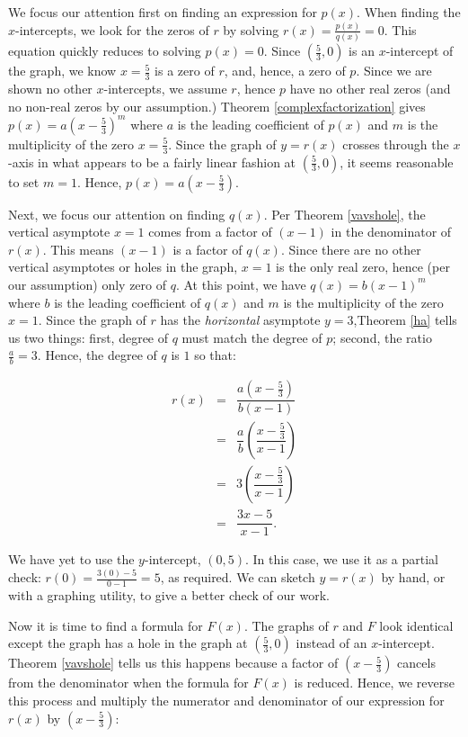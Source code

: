 \documentclass{ximera}
\begin{document}
\begin{example}
We focus our attention first on finding an expression for $p(x)$.  When finding the $x$-intercepts, we look for the zeros of $r$ by solving $r(x) = \frac{p(x)}{q(x)} = 0$.  This equation quickly reduces to solving $p(x) =0$.  Since  $\left(\frac{5}{3}, 0 \right)$ is an $x$-intercept of the graph, we know $x = \frac{5}{3}$ is a zero of $r$, and, hence, a zero of $p$.  Since we are shown no other $x$-intercepts, we assume $r$, hence $p$ have no other real zeros (and no non-real zeros by our assumption.)  Theorem \ref{complexfactorization}  gives  $p(x) = a\left(x - \frac{5}{3}\right)^m$ where $a$ is the leading coefficient of $p(x)$ and $m$ is the multiplicity of the zero $x = \frac{5}{3}$.  Since the graph of $y = r(x)$ crosses through the $x$-axis in what appears to be a fairly linear fashion at  $\left(\frac{5}{3}, 0 \right)$, it seems reasonable to set $m=1$.  Hence, $p(x) = a \left(x - \frac{5}{3}\right)$.

Next, we focus our attention on finding $q(x)$.  Per Theorem \ref{vavshole}, the vertical asymptote  $x=1$ comes from a factor of $(x-1)$ in the denominator of $r(x)$.  This means $(x-1)$ is a factor of $q(x)$.  Since there are no other vertical asymptotes or holes in the graph, $x=1$ is the only real zero, hence (per our assumption) only zero of $q$.  At this point, we have $q(x) = b(x-1)^m$ where $b$ is the leading coefficient of $q(x)$ and $m$ is the multiplicity of the zero $x=1$.  Since the graph of  $r$ has the \textit{horizontal} asymptote $y = 3$,Theorem \ref{ha} tells us two  things:  first,  degree of $q$ must match the degree of $p$; second, the ratio $\frac{a}{b} = 3$.   Hence, the degree of $q$ is $1$ so that: 

\[ \begin{array}{rcl}

r(x) & = & \dfrac{a \left(x - \frac{5}{3}\right)}{b(x-1)} \\
       & = & \dfrac{a}{b} \left(\dfrac{x - \frac{5}{3}}{x-1}\right) \\
        & = & 3  \left(\dfrac{x - \frac{5}{3}}{x-1}\right) \\
        & = & \dfrac{3x-5}{x-1}. \end{array} \]

We have yet to use the $y$-intercept, $(0,5)$.  In this case, we use it as a partial check:  $r(0) = \frac{3(0)-5}{0-1} = 5$, as required.  We can sketch $y=r(x)$ by hand, or with a graphing utility, to give a better check of our work.

Now it is time to find a formula for $F(x)$.  The graphs of $r$ and $F$ look identical except the graph has a hole in the graph at $\left(\frac{5}{3}, 0 \right)$ instead of an $x$-intercept.  Theorem \ref{vavshole} tells us this happens because a factor of $\left(x - \frac{5}{3} \right)$ cancels from the denominator when the formula for $F(x)$ is reduced.  Hence, we reverse this process and multiply the numerator and denominator of our expression for $r(x)$ by $\left(x - \frac{5}{3} \right)$:


\end{example}
\end{document}
